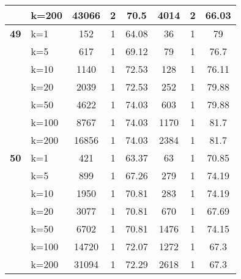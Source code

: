 \begin{table}[htbp]
\begin{tabular}{|l|l|c|c|c|c|c|c|}
     & k=200 & 43066 & 2 & 70.5 & 4014 & 2 & 66.03 \\ \hline
    \multicolumn{1}{|r|}{\textbf{49}} & k=1 & 152 & 1 & 64.08 & 36 & 1 & 79 \\ 
     & k=5 & 617 & 1 & 69.12 & 79 & 1 & 76.7 \\ 
     & k=10 & 1140 & 1 & 72.53 & 128 & 1 & 76.11 \\ 
     & k=20 & 2039 & 1 & 72.53 & 252 & 1 & 79.88 \\ 
     & k=50 & 4622 & 1 & 74.03 & 603 & 1 & 79.88 \\ 
     & k=100 & 8767 & 1 & 74.03 & 1170 & 1 & 81.7 \\ 
     & k=200 & 16856 & 1 & 74.03 & 2384 & 1 & 81.7 \\ \hline
    \multicolumn{1}{|r|}{\textbf{50}} & k=1 & 421 & 1 & 63.37 & 63 & 1 & 70.85 \\ 
     & k=5 & 899 & 1 & 67.26 & 279 & 1 & 74.19 \\ 
     & k=10 & 1950 & 1 & 70.81 & 283 & 1 & 74.19 \\ 
     & k=20 & 3077 & 1 & 70.81 & 670 & 1 & 67.69 \\ 
     & k=50 & 6702 & 1 & 70.81 & 1476 & 1 & 74.15 \\ 
     & k=100 & 14720 & 1 & 72.07 & 1272 & 1 & 67.3 \\ 
     & k=200 & 31094 & 1 & 72.29 & 2618 & 1 & 67.3 \\ \hline
    \end{tabular}
\end{table}
